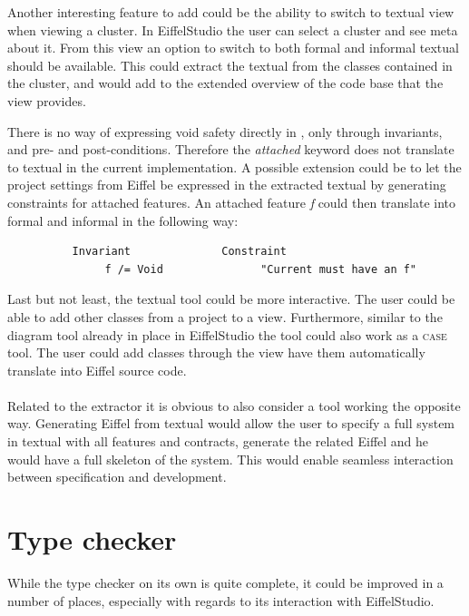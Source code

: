 Another interesting feature to add could be the ability to switch to textual \bon{} view when viewing a cluster. In EiffelStudio the user can select a cluster and see meta about it. From this view an option to switch to both formal and informal textual \bon{} should be available. This could extract the textual \bon{} from the classes contained in the cluster, and would add to the extended overview of the code base that the \bon{} view provides.

There is no way of expressing void safety directly in \bon, only through invariants, and pre- and post-conditions. Therefore the \textit{attached} keyword does not translate to textual \bon{} in the current implementation. A possible extension could be to let the project settings from Eiffel be expressed in the extracted textual \bon{} by generating constraints for attached features. An attached feature \textit{f} could then translate into formal and informal \bon{} in the following way:
\footnotesize
\begin{verbatim}
          Invariant              Constraint
               f /= Void               "Current must have an f"
\end{verbatim}

\normalsize Last but not least, the textual \bon{} tool could be more interactive. The user could be able to add other classes from a project to a \bon{} view. Furthermore, similar to the diagram tool already in place in EiffelStudio the \bon{} tool could also work as a \textsc{case} tool. The user could add classes through the \bon{} view have them automatically translate into Eiffel source code.

\paragraph{}
Related to the \bon{} extractor it is obvious to also consider a tool working the opposite way. Generating Eiffel from textual \bon{} would allow the user to specify a full system in textual \bon{} with all features and contracts, generate the related Eiffel and he would have a full skeleton of the system. This would enable seamless interaction between specification and development.

\section{Type checker}
While the type checker on its own is quite complete, it could be improved in a number of places, especially with regards to its interaction with EiffelStudio.

